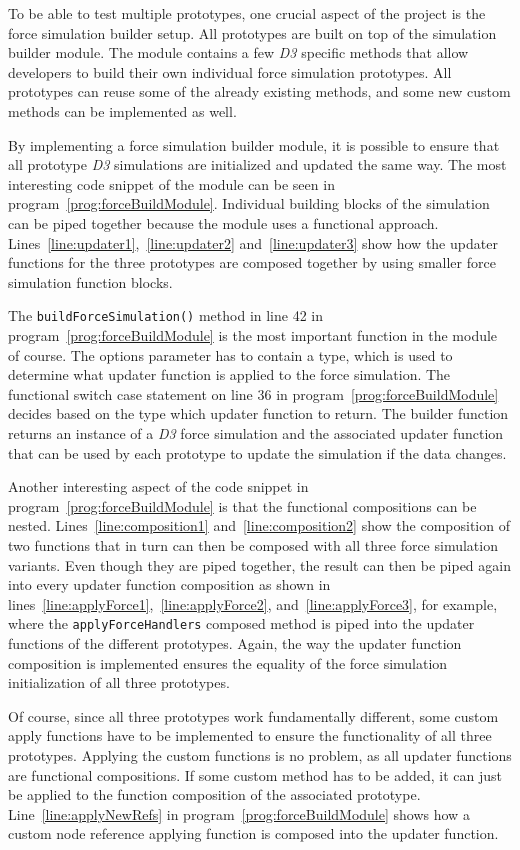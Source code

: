 To be able to test multiple prototypes, one crucial aspect of the project is the force simulation builder setup. All prototypes are built on top of the simulation builder module. The module contains a few \emph{D3} specific methods that allow developers to build their own individual force simulation prototypes. All prototypes can reuse some of the already existing methods, and some new custom methods can be implemented as well.

By implementing a force simulation builder module, it is possible to ensure that all prototype \emph{D3} simulations are initialized and updated the same way. The most interesting code snippet of the module can be seen in program~\ref{prog:forceBuildModule}. Individual building blocks of the simulation can be piped together because the module uses a functional approach. Lines~\ref{line:updater1},~\ref{line:updater2} and~\ref{line:updater3} show how the updater functions for the three prototypes are composed together by using smaller force simulation function blocks.

The \texttt{buildForceSimulation()} method in line 42 in program~\ref{prog:forceBuildModule} is the most important function in the module of course. The options parameter has to contain a type, which is used to determine what updater function is applied to the force simulation. The functional switch case statement on line 36 in program~\ref{prog:forceBuildModule} decides based on the type which updater function to return. The builder function returns an instance of a \emph{D3} force simulation and the associated updater function that can be used by each prototype to update the simulation if the data changes.

Another interesting aspect of the code snippet in program~\ref{prog:forceBuildModule} is that the functional compositions can be nested. Lines~\ref{line:composition1} and~\ref{line:composition2} show the composition of two functions that in turn can then be composed with all three force simulation variants. Even though they are piped together, the result can then be piped again into every updater function composition as shown in lines~\ref{line:applyForce1},~\ref{line:applyForce2}, and~\ref{line:applyForce3}, for example, where the \texttt{applyForceHandlers} composed method is piped into the updater functions of the different prototypes. Again, the way the updater function composition is implemented ensures the equality of the force simulation initialization of all three prototypes.

Of course, since all three prototypes work fundamentally different, some custom apply functions have to be implemented to ensure the functionality of all three prototypes. Applying the custom functions is no problem, as all updater functions are functional compositions. If some custom method has to be added, it can just be applied to the function composition of the associated prototype. Line~\ref{line:applyNewRefs} in program~\ref{prog:forceBuildModule} shows how a custom node reference applying function is composed into the updater function.

